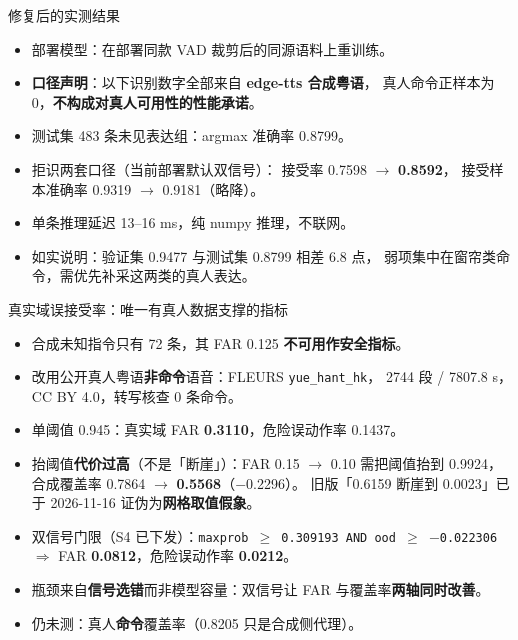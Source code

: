 \documentclass[10pt]{beamer}
\begin{document}
\begin{frame}{修复后的实测结果}
    \begin{itemize}
        \item 部署模型：在部署同款 VAD 裁剪后的同源语料上重训练。
        \item \textbf{口径声明}：以下识别数字全部来自 \textbf{edge-tts 合成粤语}，
              真人命令正样本为 0，\textbf{不构成对真人可用性的性能承诺}。
        \item 测试集 483 条未见表达组：argmax 准确率 0.8799。
        \item 拒识两套口径（当前部署默认双信号）：
              接受率 0.7598 $\rightarrow$ \textbf{0.8592}，
              接受样本准确率 0.9319 $\rightarrow$ 0.9181（略降）。
        \item 单条推理延迟 13--16 ms，纯 numpy 推理，不联网。
        \item 如实说明：验证集 0.9477 与测试集 0.8799 相差 6.8 点，
              弱项集中在窗帘类命令，需优先补采这两类的真人表达。
    \end{itemize}
\end{frame}
\begin{frame}{真实域误接受率：唯一有真人数据支撑的指标}
    \begin{itemize}
        \item 合成未知指令只有 72 条，其 FAR 0.125 \textbf{不可用作安全指标}。
        \item 改用公开真人粤语\textbf{非命令}语音：FLEURS \texttt{yue\_hant\_hk}，
              2744 段 / 7807.8 s，CC BY 4.0，转写核查 0 条命令。
        \item 单阈值 0.945：真实域 FAR \textbf{0.3110}，危险误动作率 0.1437。
        \item 抬阈值\textbf{代价过高}（不是「断崖」）：FAR 0.15 $\rightarrow$ 0.10 需把阈值抬到 0.9924，
              合成覆盖率 0.7864 $\rightarrow$ \textbf{0.5568}（$-$0.2296）。
              旧版「0.6159 断崖到 0.0023」已于 2026-11-16 证伪为\textbf{网格取值假象}。
        \item 双信号门限（S4 已下发）：\texttt{maxprob $\geq$ 0.309193 AND ood $\geq$ $-$0.022306}
              $\Rightarrow$ FAR \textbf{0.0812}，危险误动作率 \textbf{0.0212}。
        \item 瓶颈来自\textbf{信号选错}而非模型容量：双信号让 FAR 与覆盖率\textbf{两轴同时改善}。
        \item 仍未测：真人\textbf{命令}覆盖率（0.8205 只是合成侧代理）。
    \end{itemize}
\end{frame}
\end{document}
